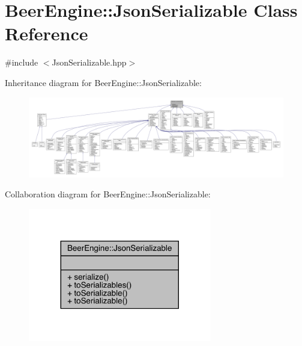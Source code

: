 \hypertarget{class_beer_engine_1_1_json_serializable}{}\section{Beer\+Engine\+:\+:Json\+Serializable Class Reference}
\label{class_beer_engine_1_1_json_serializable}


{\ttfamily \#include $<$Json\+Serializable.\+hpp$>$}



Inheritance diagram for Beer\+Engine\+:\+:Json\+Serializable\+:
\nopagebreak
\begin{figure}[H]
\begin{center}
\leavevmode
\includegraphics[width=350pt]{class_beer_engine_1_1_json_serializable__inherit__graph}
\end{center}
\end{figure}


Collaboration diagram for Beer\+Engine\+:\+:Json\+Serializable\+:\nopagebreak
\begin{figure}[H]
\begin{center}
\leavevmode
\includegraphics[width=227pt]{class_beer_engine_1_1_json_serializable__coll__graph}
\end{center}
\end{figure}
